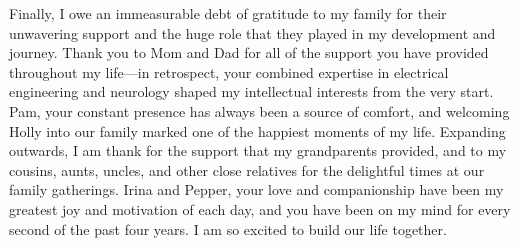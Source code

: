 Finally, I owe an immeasurable debt of gratitude to my family for their unwavering support and the huge role that they played in my development and journey. Thank you to Mom and Dad for all of the support you have provided throughout my life—in retrospect, your combined expertise in electrical engineering and neurology shaped my intellectual interests from the very start. Pam, your constant presence has always been a source of comfort, and welcoming Holly into our family marked one of the happiest moments of my life. Expanding outwards, I am thank for the support that my grandparents provided, and to my cousins, aunts, uncles, and other close relatives for the delightful times at our family gatherings. Irina and Pepper, your love and companionship have been my greatest joy and motivation of each day, and you have been on my mind for every second of the past four years. I am so excited to build our life together.